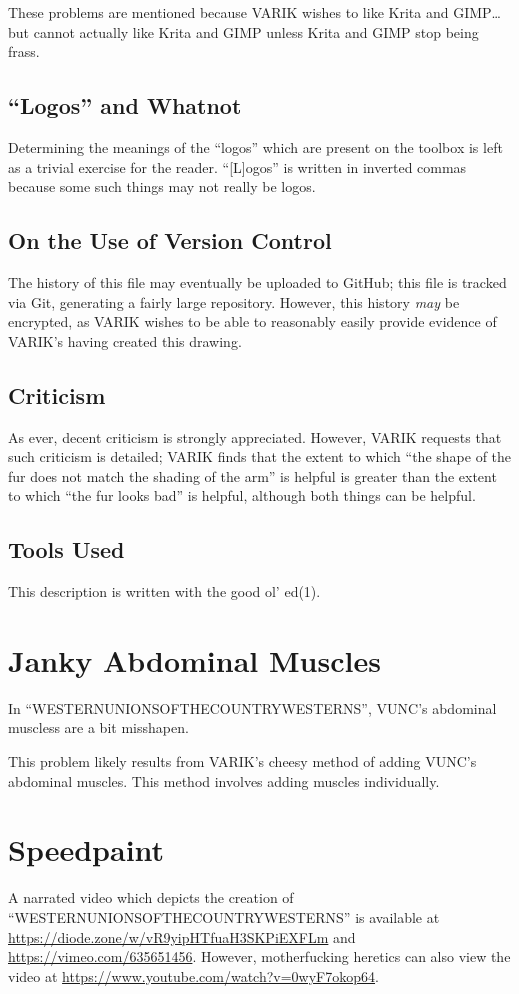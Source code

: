 \documentclass{report}
\begin{document}
These problems are mentioned because VARIK wishes to like Krita and GIMP\ldots but cannot actually like Krita and GIMP unless Krita and GIMP stop being frass.
\subsection{``Logos'' and Whatnot}
Determining the meanings of the ``logos'' which are present on the toolbox is left as a trivial exercise for the reader.  ``[L]ogos'' is written in inverted commas because some such things may not really be logos.
\subsection{On the Use of Version Control}
The history of this file may eventually be uploaded to GitHub; this file is tracked via Git, generating a fairly large repository.  However, this history \textit{may} be encrypted, as VARIK wishes to be able to reasonably easily provide evidence of VARIK's having created this drawing.
\subsection{Criticism}
As ever, decent criticism is strongly appreciated.  However, VARIK requests that such criticism is detailed; VARIK finds that the extent to which ``the shape of the fur does not match the shading of the arm'' is helpful is greater than the extent to which ``the fur looks bad'' is helpful, although both things can be helpful.
\subsection{Tools Used}
This description is written with the good ol' ed(1).
\section{Janky Abdominal Muscles}
In ``WESTERNUNIONSOFTHECOUNTRYWESTERNS'', VUNC's abdominal muscless are a bit misshapen.

This problem likely results from VARIK's cheesy method of adding VUNC's abdominal muscles.  This method involves adding muscles individually.
\section{Speedpaint}
A narrated video which depicts the creation of ``WESTERNUNIONSOFTHECOUNTRYWESTERNS'' is available at \url{https://diode.zone/w/vR9yipHTfuaH3SKPiEXFLm} and \url{https://vimeo.com/635651456}.  However, motherfucking heretics can also view the video at \url{https://www.youtube.com/watch?v=0wyF7okop64}.
\end{document}

